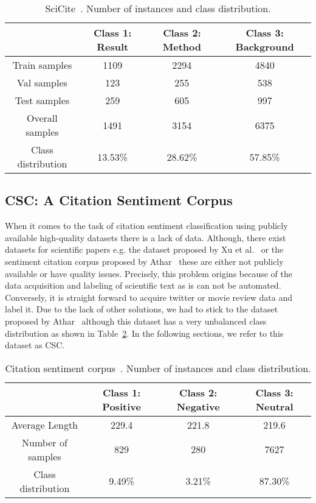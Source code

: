 \documentclass[runningheads]{llncs}
\begin{document}
\begin{table}[!t]
\renewcommand{\arraystretch}{1.3}
\caption{SciCite~\cite{cohan2019structural}. Number of instances and class distribution.}
\label{tab:scicite_data}
\centering
\begin{tabular}{|c|c|c|c|}
\hline
 & Class 1: Result & Class 2: Method & Class 3: Background \\
\hline
Train samples & 1109 & 2294 & 4840 \\
\hline
Val samples & 123 & 255 & 538 \\
\hline
Test samples & 259 & 605 & 997 \\
\hline
Overall samples & 1491 & 3154 & 6375 \\
\hline
Class distribution & 13.53\% & 28.62\% & 57.85\% \\
\hline
\end{tabular}
\end{table}

\subsection{CSC: A Citation Sentiment Corpus}
When it comes to the task of citation sentiment classification using publicly available high-quality datasets there is a lack of data. Although, there exist datasets for scientific papers e.g. the dataset proposed by Xu et al.~\cite{xu2015citation} or the sentiment citation corpus proposed by Athar~\cite{athar:2011:SS} these are either not publicly available or have quality issues. Precisely, this problem origins because of the data acquisition and labeling of scientific text as is can not be automated. Conversely, it is straight forward to acquire twitter or movie review data and label it. Due to the lack of other solutions, we had to stick to the dataset proposed by Athar~\cite{athar:2011:SS} although this dataset has a very unbalanced class distribution as shown in Table~\ref{tab:scc_sample_avg}. In the following sections, we refer to this dataset as CSC.

\begin{table}[!t]
\renewcommand{\arraystretch}{1.3}
\caption{Citation sentiment corpus~\cite{athar:2011:SS}. Number of instances and class distribution.}
\label{tab:scc_sample_avg}
\centering
\begin{tabular}{|c|c|c|c|}
\hline
 & Class 1: Positive & Class 2: Negative & Class 3: Neutral \\
\hline
Average Length & 229.4 & 221.8 & 219.6 \\
\hline
Number of samples & 829 & 280 & 7627 \\
\hline
Class distribution & 9.49\% & 3.21\% & 87.30\% \\
\hline
\end{tabular}
\end{table}
\end{document}

